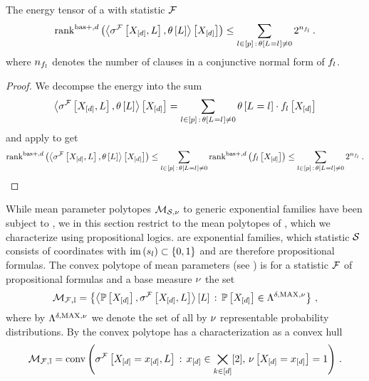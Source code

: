 \begin{corollary}
    The energy tensor of a \HybridLogicNetwork{} with statistic $\mathcal{F}$
    \begin{align*}
        \mathrm{rank}^{\mathrm{bas+},d}\left(\left\langle \sigma^{\mathcal{F}}\left[X_{[d]},L\right],\theta\left[L\right]\right\rangle \left[ X_{[d]} \right]\right) \leq \sum_{l\in[p]\,:\,\theta\left[L_{}=l_{}\right]\neq0} 2^{n_{f_{l}}} \, .
    \end{align*}
    where $n_{f_{l}}$ denotes the number of clauses in a conjunctive normal form of $f_{l}$.
\end{corollary}
\begin{proof}
    We decompse the energy into the sum
    \begin{align*}
        \left\langle \sigma^{\mathcal{F}}\left[X_{[d]},L\right],\theta\left[L\right]\right\rangle \left[ X_{[d]} \right]
        = \sum_{l\in[p]\,:\,\theta\left[L_{}=l_{}\right]\neq0} \theta\left[L_{}=l_{}\right] \cdot f_{l}\left[X_{[d]}\right]
    \end{align*}
    and apply  to get
    \begin{align*}
        \mathrm{rank}^{\mathrm{bas+},d}\left(\left\langle \sigma^{\mathcal{F}}\left[X_{[d]},L\right],\theta\left[L\right]\right\rangle \left[ X_{[d]} \right]\right)
        \leq \sum_{l\in[p]\,:\,\theta\left[L_{}=l_{}\right]\neq0} \mathrm{rank}^{\mathrm{bas+},d}\left(f_{l}\left[X_{[d]}\right]\right)
        \leq \sum_{l\in[p]\,:\,\theta\left[L_{}=l_{}\right]\neq0}2^{n_{f_{l}}} \, .
    \end{align*}
\end{proof}



While mean parameter polytopes $\mathcal{M}_{\mathcal{S},\nu}$ to generic exponential families have been subject to , we in this section restrict to the mean polytopes of \HybridLogicNetworks{}, which we characterize using propositional logics.
\HybridLogicNetworks{} are exponential families, which statistic $\mathcal{S}$ consists of coordinates with $\mathrm{im}\left(s_{l}\right)\subset\{0,1\}$ and are therefore propositional formulas.
The convex polytope of mean parameters (see ) is for a statistic $\mathcal{F}$ of propositional formulas and a base measure $\nu$ the set
\begin{align*}
    \mathcal{M}_{\mathcal{F},\mathbb{I}} = \left\{ \left\langle \mathbb{P}\left[X_{[d]}\right],\sigma^{\mathcal{F}}\left[X_{[d]},L\right]\right\rangle \left[ L \right] \,:\, \mathbb{P}\left[X_{[d]}\right]\in\Lambda^{\delta,\mathrm{MAX},\nu} \right\} \, ,
\end{align*}
where by $\Lambda^{\delta,\mathrm{MAX},\nu}$ we denote the set of all by $\nu$ representable probability distributions.
By  the convex polytope has a characterization as a convex hull
\begin{align}
    \label{eq:hlnMeansetConvCharacterization}
    \mathcal{M}_{\mathcal{F},\mathbb{I}}
    = \mathrm{conv}\left(\sigma^{\mathcal{F}}\left[X_{[d]}=x_{[d]},L\right] \,:\, x_{[d]}\in\bigtimes_{k\in[d]}[2], \, \nu\left[X_{[d]}=x_{[d]}\right]=1\right) \, .
\end{align}

